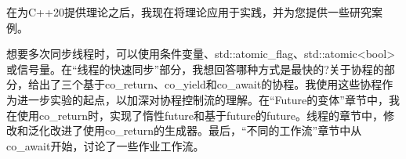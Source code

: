 
在为C++20提供理论之后，我现在将理论应用于实践，并为您提供一些研究案例。

想要多次同步线程时，可以使用条件变量、std::atomic\_flag、std::atomic<bool>或信号量。在“线程的快速同步”部分，我想回答哪种方式是最快的?关于协程的部分，给出了三个基于co\_return、co\_yield和co\_await的协程。我使用这些协程作为进一步实验的起点，以加深对协程控制流的理解。在“Future的变体”章节中，我在使用co\_return时，实现了惰性future和基于future的future。线程的章节中，修改和泛化改进了使用co\_return的生成器。最后，“不同的工作流”章节中从co\_await开始，讨论了一些作业工作流。


